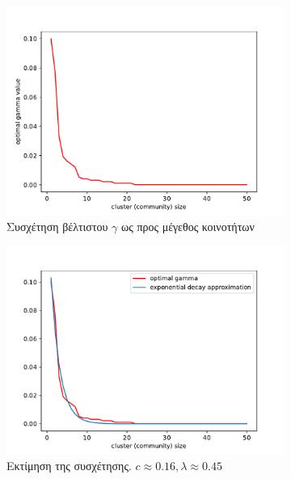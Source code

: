 \documentclass[10pt, letterpaper]{article}
\begin{document}
\begin{figure}[H]
  \begin{subfigure}{0.5\textwidth}
    \centering
    \includegraphics[width=0.9\linewidth]{gamma_wrt_cluster_nodes.pdf}
    \caption{Συσχέτηση βέλτιστου $\gamma$ ως προς μέγεθος κοινοτήτων}
    \label{optimal_gamma}
  \end{subfigure}
  \begin{subfigure}{0.5\textwidth}
    \centering
    \includegraphics[width=0.9\linewidth]{gammas_approximation.pdf}
    \caption{Εκτίμηση της συσχέτησης. $c \approx 0.16, \lambda \approx 0.45$}
    \label{optimal_gamma_approx}
  \end{subfigure}

  \caption{}
  \label{}
\end{figure}
\end{document}
